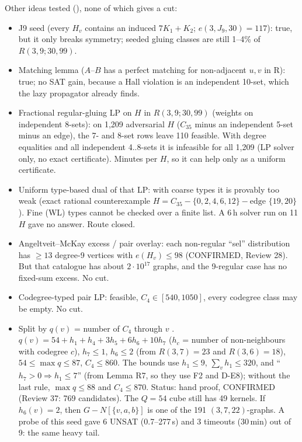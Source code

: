 Other ideas tested (), none of which gives a cut:
\begin{itemize}
\item J9 seed (every $H_v$ contains an induced $7K_1 + K_2$; \cite{GR} $e(3,J_9,30) = 117$): true, but it only breaks symmetry;
  seeded gluing classes are still 1--4\% of $R(3,9;30,99)$.
\item Matching lemma ($A$--$B$ has a perfect matching for non-adjacent $u, v$ in R): true; no SAT gain, because a Hall violation
  is an independent 10-set, which the lazy propagator already finds.
\item Fractional regular-gluing LP on $H$ in $R(3,9;30,99)$ (weights on independent 8-sets): on 1,209 adversarial $H$
  ($C_{35}$ minus an independent 5-set minus an edge), the 7- and 8-set rows leave 110 feasible. With degree
  equalities and all independent 4..8-sets it is infeasible for all 1,209 (LP solver only, no exact certificate).
  Minutes per $H$, so it can help only as a uniform certificate.
\item Uniform type-based dual of that LP: with coarse types it is provably too weak (exact rational counterexample
  $H = C_{35} - \{0,2,4,6,12\} - \text{edge } \{19,20\}$). Fine (WL) types cannot be checked over a finite list. A 6\,h solver run on
  11 $H$ gave no answer. Route closed.
\item Angeltveit--McKay excess / pair overlay: each non-regular ``sel'' distribution has $\ge 13$ degree-9 vertices with
  $e(H_v) \le 98$ (CONFIRMED, Review 28). But that catalogue has about $2\cdot 10^{17}$ graphs, and the 9-regular case has
  no fixed-sum excess. No cut.
\item Codegree-typed pair LP: feasible, $C_4 \in [540, 1050]$, every codegree class may be empty. No cut.
\item Split by $q(v)$ = number of $C_4$ through $v$ . $q(v) = 54 + h_1 + h_4 + 3 h_5 + 6 h_6 + 10 h_7$ ($h_c$ = number of
  non-neighbours with codegree $c$), $h_7 \le 1$, $h_6 \le 2$ (from $R(3,7) = 23$ and $R(3,6) = 18$), $54 \le \max q \le 87$, $C_4 \le 860$.
  The bounds use $h_1 \le 9$, $\sum_v h_1 \le 320$, and ``$h_7 > 0 \Rightarrow h_1 \le 7$'' (from Lemma R7, so they use F2 and D-E8);
  without the last rule, $\max q \le 88$ and $C_4 \le 870$. Status: hand proof, CONFIRMED (Review 37: 769 candidates). The $Q = 54$ cube still has
  49 kernels. If $h_6(v) = 2$, then $G - N[\{v, a, b\}]$ is one of the 191 $(3,7,22)$-graphs. A probe of this seed gave
  6 UNSAT (0.7--277\,s) and 3 timeouts (30\,min) out of 9: the same heavy tail.
\end{itemize}

